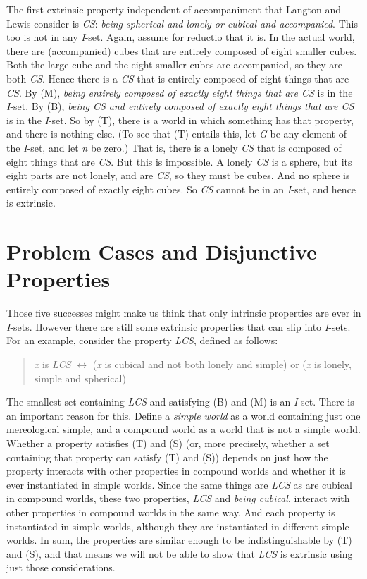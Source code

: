 \documentclass[
  11pt,
  letterpaper,
  DIV=11,
  numbers=noendperiod,
  twoside]{scrartcl}
\begin{document}
The first extrinsic property independent of accompaniment that Langton
and Lewis consider is \emph{CS}: \emph{being spherical and lonely or
cubical and accompanied}. This too is not in any \emph{I}-set. Again,
assume for reductio that it is. In the actual world, there are
(accompanied) cubes that are entirely composed of eight smaller cubes.
Both the large cube and the eight smaller cubes are accompanied, so they
are both \emph{CS}. Hence there is a \emph{CS} that is entirely composed
of eight things that are \emph{CS}. By (M), \emph{being entirely
composed of exactly eight things that are CS} is in the \emph{I}-set. By
(B), \emph{being CS and entirely composed of exactly eight things that
are CS} is in the \emph{I}-set. So by (T), there is a world in which
something has that property, and there is nothing else. (To see that (T)
entails this, let \emph{G} be any element of the \emph{I}-set, and let
\emph{n} be zero.) That is, there is a lonely \emph{CS} that is composed
of eight things that are \emph{CS}. But this is impossible. A lonely
\emph{CS} is a sphere, but its eight parts are not lonely, and are
\emph{CS}, so they must be cubes. And no sphere is entirely composed of
exactly eight cubes. So \emph{CS} cannot be in an \emph{I}-set, and
hence is extrinsic.

\section{Problem Cases and Disjunctive Properties}\label{sec-problem}

Those five successes might make us think that only intrinsic properties
are ever in \emph{I}-sets. However there are still some extrinsic
properties that can slip into \emph{I}-sets. For an example, consider
the property \emph{LCS}, defined as follows:

\begin{quote}
\emph{x} is \emph{LCS} \({\leftrightarrow}\) (\emph{x} is cubical and
not both lonely and simple) or (\emph{x} is lonely, simple and
spherical)
\end{quote}

The smallest set containing \emph{LCS} and satisfying (B) and (M) is an
\emph{I}-set. There is an important reason for this. Define a
\emph{simple world} as a world containing just one mereological simple,
and a compound world as a world that is not a simple world. Whether a
property satisfies (T) and (S) (or, more precisely, whether a set
containing that property can satisfy (T) and (S)) depends on just how
the property interacts with other properties in compound worlds and
whether it is ever instantiated in simple worlds. Since the same things
are \emph{LCS} as are cubical in compound worlds, these two properties,
\emph{LCS} and \emph{being cubical}, interact with other properties in
compound worlds in the same way. And each property is instantiated in
simple worlds, although they are instantiated in different simple
worlds. In sum, the properties are similar enough to be
indistinguishable by (T) and (S), and that means we will not be able to
show that \emph{LCS} is extrinsic using just those considerations.
\end{document}
